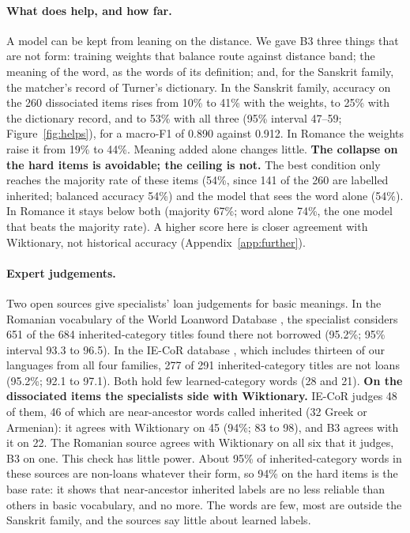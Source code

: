 \documentclass[11pt]{article}
\begin{document}
\paragraph{What does help, and how far.} A model can be kept from leaning on the distance. We gave B3 three things that are not form: training weights that balance route against distance band; the meaning of the word, as the words of its definition; and, for the Sanskrit family, the matcher's record of Turner's dictionary. In the Sanskrit family, accuracy on the 260 dissociated items rises from 10\% to 41\% with the weights, to 25\% with the dictionary record, and to 53\% with all three (95\% interval 47--59; Figure~\ref{fig:helps}), for a macro-F1 of 0.890 against 0.912. In Romance the weights raise it from 19\% to 44\%. Meaning added alone changes little. \textbf{The collapse on the hard items is avoidable; the ceiling is not.} The best condition only reaches the majority rate of these items (54\%, since 141 of the 260 are labelled inherited; balanced accuracy 54\%) and the model that sees the word alone (54\%). In Romance it stays below both (majority 67\%; word alone 74\%, the one model that beats the majority rate). A higher score here is closer agreement with Wiktionary, not historical accuracy (Appendix~\ref{app:further}).

\paragraph{Expert judgements.} Two open sources give specialists' loan judgements for basic meanings. In the Romanian vocabulary of the World Loanword Database \citep{schulte2009romanian}, the specialist considers 651 of the 684 inherited-category titles found there not borrowed (95.2\%; 95\% interval 93.3 to 96.5). In the IE-CoR database \citep{heggarty2024iecor}, which includes thirteen of our languages from all four families, 277 of 291 inherited-category titles are not loans (95.2\%; 92.1 to 97.1). Both hold few learned-category words (28 and 21). \textbf{On the dissociated items the specialists side with Wiktionary.} IE-CoR judges 48 of them, 46 of which are near-ancestor words called inherited (32 Greek or Armenian): it agrees with Wiktionary on 45 (94\%; 83 to 98), and B3 agrees with it on 22. The Romanian source agrees with Wiktionary on all six that it judges, B3 on one. This check has little power. About 95\% of inherited-category words in these sources are non-loans whatever their form, so 94\% on the hard items is the base rate: it shows that near-ancestor inherited labels are no less reliable than others in basic vocabulary, and no more. The words are few, most are outside the Sanskrit family, and the sources say little about learned labels.
\end{document}
